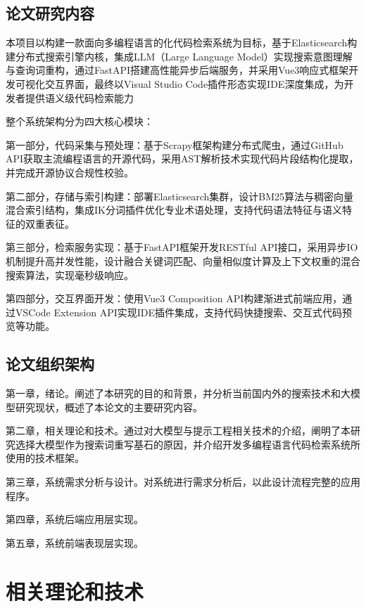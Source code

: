 \documentclass[UTF8,a4paper,12pt]{ctexart}
\numberwithin{equation}{section}
\begin{document}
\subsection{论文研究内容}
本项目以构建一款面向多编程语言的化代码检索系统为目标，基于Elasticsearch构建分布式搜索引擎内核，集成LLM（Large Language Model）实现搜索意图理解与查询词重构，通过FastAPI搭建高性能异步后端服务，并采用Vue3响应式框架开发可视化交互界面，最终以Visual Studio Code插件形态实现IDE深度集成，为开发者提供语义级代码检索能力\par
整个系统架构分为四大核心模块：\par
第一部分，​代码采集与预处理：基于Scrapy框架构建分布式爬虫，通过GitHub API获取主流编程语言的开源代码，采用AST解析技术实现代码片段结构化提取，并完成开源协议合规性校验。\par
第二部分，​存储与索引构建：部署Elasticsearch集群，设计BM25算法与稠密向量混合索引结构，集成IK分词插件优化专业术语处理，支持代码语法特征与语义特征的双重表征。\par
第三部分，​检索服务实现：基于FastAPI框架开发RESTful API接口，采用异步IO机制提升高并发性能，设计融合关键词匹配、向量相似度计算及上下文权重的混合搜索算法，实现毫秒级响应。\par
第四部分，​交互界面开发：使用Vue3 Composition API构建渐进式前端应用，通过VSCode Extension API实现IDE插件集成，支持代码快捷搜索、交互式代码预览等功能。\par

\subsection{论文组织架构}
第一章，绪论。阐述了本研究的目的和背景，并分析当前国内外的搜索技术和大模型研究现状，概述了本论文的主要研究内容。\par
第二章，相关理论和技术。通过对大模型与提示工程相关技术的介绍，阐明了本研究选择大模型作为搜索词重写基石的原因，并介绍开发多编程语言代码检索系统所使用的技术框架。\par
第三章，系统需求分析与设计。对系统进行需求分析后，以此设计流程完整的应用程序。\par
第四章，系统后端应用层实现。\par
第五章，系统前端表现层实现。\par


\newpage
{}

\section{相关理论和技术}
\end{document}
